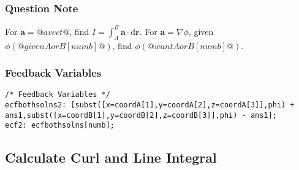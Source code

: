 \documentclass[a4paper,10pt]{article}
\begin{document}
\subsubsection{Question Note}
For \(\mathbf{a} = @avect@\), find \(I = \int_{A}^{B} \textbf{a} \cdot \text{d}\textbf{r}\). For \(\mathbf{a} = \nabla \phi\), given \(\phi(@givenAorB[numb]@)\), find \(\phi(@wantAorB[numb]@)\).
\subsubsection{Feedback Variables}
\begin{lstlisting}
/* Feedback Variables */
ecfbothsolns2: [subst([x=coordA[1],y=coordA[2],z=coordA[3]],phi) + ans1,subst([x=coordB[1],y=coordB[2],z=coordB[3]],phi) - ans1];
ecf2: ecfbothsolns[numb];
\end{lstlisting}

\subsection{Calculate Curl and Line Integral}
\end{document}
